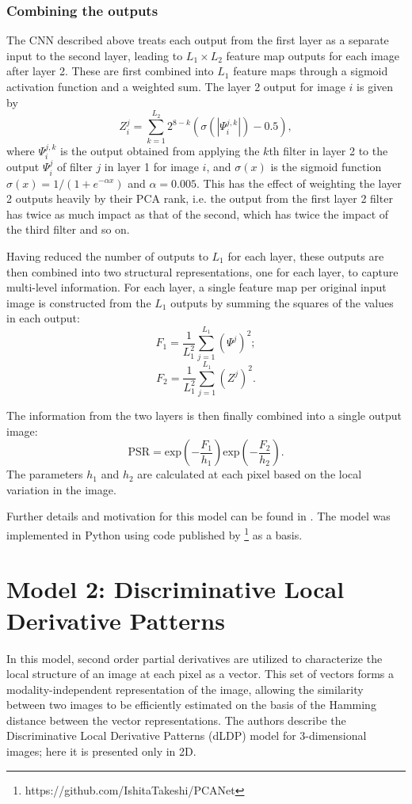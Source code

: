 \documentclass{report}
\begin{document}
\subsubsection{Combining the outputs}
\label{sec:featuremaps}
The CNN described above treats each output from the first layer as a separate input to the second layer, leading to $L_1 \times L_2$ feature map outputs for each image after layer 2. These are first combined into $L_1$ feature maps through a sigmoid activation function and a weighted sum. The layer 2 output for image $i$ is given by 
\[
Z_{i}^{j} = \sum_{k=1}^{L_2} 2^{8-k}(\sigma(|\Psi_i^{j,k}|)-0.5),
\]
where $\Psi_i^{j,k}$ is the output obtained from applying the $k$th filter in layer 2 to the output $\Psi_i^j$ of filter $j$ in layer 1 for image $i$, and $\sigma(x)$ is the sigmoid function $\sigma(x) = 1/(1+e^{-\alpha x})$ and $\alpha=0.005$. This has the effect of weighting the layer 2 outputs heavily by their PCA rank, i.e. the output from the first layer 2 filter has twice as much impact as that of the second, which has twice the impact of the third filter and so on.

Having reduced the number of outputs to $L_1$ for each layer, these outputs are then combined into two structural representations, one for each layer, to capture multi-level information. For each layer, a single feature map per original input image is constructed from the $L_1$ outputs by summing the squares of the values in each output:
\[
F_1 = \frac{1}{L_1^2}\sum_{j=1}^{L_1}(\Psi^j)^2;
\]
\[
F_2 = \frac{1}{L_1^2}\sum_{j=1}^{L_1}(Z^j)^2.
\]

The information from the two layers is then finally combined into a single output image:
\[
\text{PSR} = \text{exp}(-\frac{F_1}{h_1})\text{exp}(-\frac{F_2}{h_2}).
\]
The parameters $h_1$ and $h_2$ are calculated at each pixel based on the local variation in the image.

Further details and motivation for this model can be found in \cite{zhu2018pcanet}. The model was implemented in Python using code published by \citeauthor{takeshi2019pcanet} \footnote{https://github.com/IshitaTakeshi/PCANet} as a basis.

\section{Model 2: Discriminative Local Derivative Patterns}
\label{sec:model2}
In this model, second order partial derivatives are utilized to characterize the local structure of an image at each pixel as a vector. This set of vectors forms a modality-independent representation of the image, allowing the similarity between two images to be efficiently estimated on the basis of the Hamming distance between the vector representations. The authors \citep{jiang2017fast} describe the Discriminative Local Derivative Patterns (dLDP) model for 3-dimensional images; here it is presented only in 2D.
\end{document}
